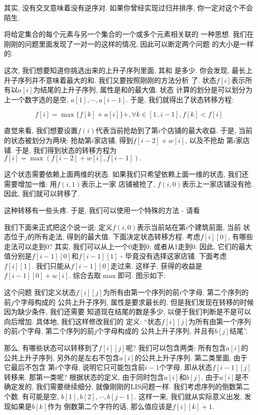 其实, 没有交叉意味着没有逆序对. 如果你曾经实现过归并排序, 你一定对这个不会陌生. 

 将给定集合的每个元素与另一个集合的一个或多个元素相关联的
一种思想. 我们在刚刚的问题里面发现了一对一的这样的情况, 因此可以断定两个问题
的大小是一样的. 

 这次, 我们想要知道你挑选出来的上升子序列里面, 其和
是多少. 你会发现, 最长上升子序列并不意味着最大的和. 我们又要按照刚刚的方法分析
了.  状态$f[i]$表示所有以$a[i]$为结尾的上升子序列, 属性是和的最大值. 状态
计算的划分是可以划分为上一个数字选的是空, $a[1], \cdots, a[i-1]$. 于是, 
我们就得出了状态转移方程: 

$$f[i] = \max \{f[k]+a[i]\} +, \forall k\in [1..i-1], f[k]<f[i]$$ 

直觉来看, 我们想要设置$f(i)$代表当前抢劫到了第$i$个店铺的最大收益. 于是, 当前
的状态被划分为两块: 抢劫第$i$家店铺, 得到$f[i-2]+w[i]$, 以及不抢劫
第$i$家店铺. 于是, 我们得到状态的转移方程为$f[i]=\max(f[i-2]+w[i], f[i-1]).$

这个状态需要依赖上面两维的状态. 如果我们只希望依赖上面一维的状态, 
我们还需要增加一维: 用$f(i, 1)$表示上一家
店铺被抢了, $f(i, 0)$表示上一家店铺没有抢. 因此, 我们就可以转移了. 

这种转移有一些头疼. 于是, 我们可以使用一个特殊的方法 - 请看


我们下面来正式把这个说一说: 定义$f(i,0)$表示当前站在第$i$个建筑前面, 当前
状态位于$j$的所有走法, 得到的最大值. 下面决定状态转移方程. 考虑$f[i][0]$, 
有哪些走法可以走到0? 其实, 我们可以从上一个0走到0; 或者从1走到0. 因此, 
它们的最大值分别是$f[i-1][0]$和$f[i-1][1]$ - 毕竟没有选择这家店铺. 
下面考虑$f[i][1]$. 我们只能从$f[i-1][0]$走过来. 这样子, 获得的收益是
$f[i-1][0] + w[i]$. 综合去取$\max$即可. 图示如下:


 这个问题
我们定义状态$f[i][j]$为所有由第一个序列的前$i$个字母, 第二个序列的前$j$个字母构成的
公共上升子序列, 属性是要求最长的. 但是我们发现在转移的时候因为缺少条件, 我们还需要
知道现在结尾的数是多少, 以便于我们判断是不是可以向后增加. 具体地, 我们这样修改我们的
定义: ``状态$f[i][j]$为所有由第一个序列的前$i$个字母, 第二个序列的前$j$个字母构成的
公共上升子序列, 并且有$b[j]$结尾''. 

那么, 有哪些状态可以转移到了$f[i][j]$呢? 我们可以包含两类: 所有包含$a[i]$的 
公共上升子序列, 另外的是左右不包含$a[i]$的公共上升子序列. 第二类里面, 由于它最后不包含
第$i$个字母, 说明它只可能包含前$i-1$个字母. 即从状态$f[i-1][j]$转移来. 那第一类呢? 
根据状态的定义, 由于同时包含$a[i]$和$b[j]$. 由于$a[i]$是不确定发的, 我们需要继续细分, 
就像刚刚的LIS问题一样. 我们考虑序列的倒数第二个数. 有可能是空, 
$b[1], b[2], \cdots, b[j-1]$. 这样一来, 我们就从实际意义出发, 发现如果是$b[k]$作为
倒数第二个字符的话, 那么值应该是$f[i][k]+1$. 

